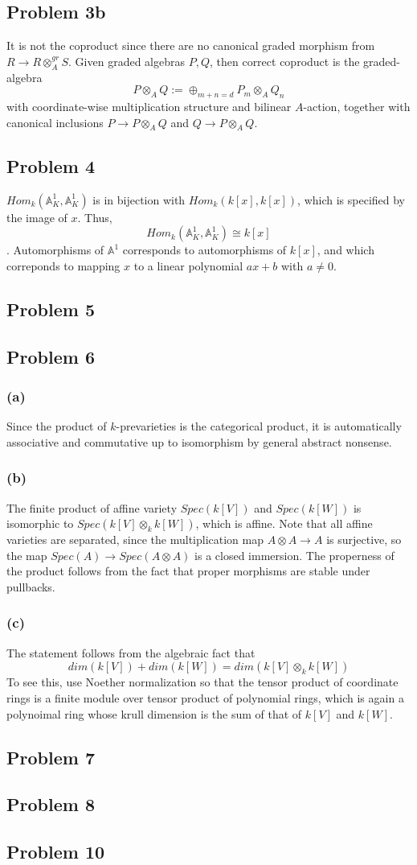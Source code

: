 \documentclass{article}
\theoremstyle{definition}
\theoremstyle{definition}
\theoremstyle{definition}
\theoremstyle{definition}
\theoremstyle{definition}
\theoremstyle{definition}
\theoremstyle{definition}
\begin{document}
\subsection*{Problem 3b}
It is not the coproduct since there are no canonical graded morphism from $R\to R\otimes^{gr}_A S$. Given graded algebras $P,Q$, then correct coproduct is the graded-algebra 
\[P\otimes_A Q:=\oplus_{m+n=d}P_m\otimes_A Q_n\]
with coordinate-wise multiplication structure and bilinear $A$-action, together with canonical inclusions $P\to P\otimes_A Q$ and $Q\to P\otimes_A Q$.


\subsection*{Problem 4}
$Hom_k(\mathbb{A}_K^1,\mathbb{A}_K^1)$ is in bijection with $Hom_k(k[x],k[x])$, which is specified by the image of $x$. Thus, \[Hom_k(\mathbb{A}_K^1,\mathbb{A}_K^1)\cong k[x]\]. Automorphisms of $\mathbb{A}^1$ corresponds to automorphisms of $k[x]$, and which correponds to mapping $x$ to a linear polynomial $ax+b$ with $a\neq 0$. 

\subsection*{Problem 5}


\subsection*{Problem 6}
\subsubsection*{(a)}
Since the product of $k$-prevarieties is the categorical product, it is automatically associative and commutative up to isomorphism by general abstract nonsense.
\subsubsection*{(b)}
The finite product of affine variety $Spec(k[V])$ and $Spec(k[W])$ is isomorphic to $Spec(k[V]\otimes_k k[W])$, which is affine. Note that all affine varieties are separated, since the multiplication map $A\otimes A\to A$ is surjective, so the map $Spec(A)\to Spec(A\otimes A)$ is a closed immersion. The properness of the product follows from the fact that proper morphisms are stable under pullbacks. 
\subsubsection*{(c)}
The statement follows from the algebraic fact that 
\[dim(k[V])+ dim(k[W])=dim(k[V]\otimes_k k[W])\]
To see this, use Noether normalization so that the tensor product of coordinate rings is a finite module over tensor product of polynomial rings, which is again a polynoimal ring whose krull dimension is the sum of that of $k[V]$ and $k[W]$. 



\subsection*{Problem 7}


\subsection*{Problem 8}
\subsection*{Problem 10}
\end{document}
